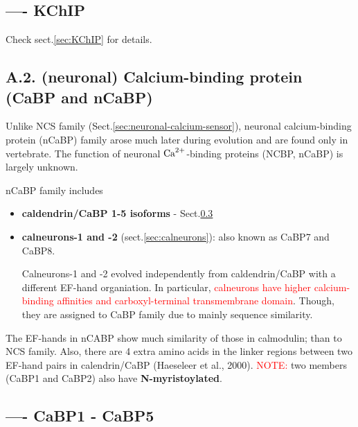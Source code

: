 \subsection{---- KChIP}

Check sect.\ref{sec:KChIP} for details.



\subsection{A.2. (neuronal) Calcium-binding protein (CaBP and nCaBP)}

Unlike NCS family (Sect.\ref{sec:neuronal-calcium-sensor}), neuronal
calcium-binding protein (nCaBP) family arose much later during evolution and are
found only in vertebrate.   The function of neuronal ${\text{Ca}^{2+}}$-binding proteins
(NCBP, nCaBP) is largely unknown.

nCaBP family includes

\begin{itemize}

  \item {\bf caldendrin/CaBP 1-5 isoforms} - Sect.\ref{sec:CaBP1-CaBP5}
  
  \item {\bf calneurons-1 and -2} (sect.\ref{sec:calneurons}): also known as
  CaBP7 and CaBP8.
  
  Calneurons-1 and -2 evolved independently from caldendrin/CaBP with a
  different EF-hand organiation. In particular, \textcolor{red}{calneurons have
  higher calcium-binding affinities and carboxyl-terminal transmembrane domain}.
  Though, they are assigned to CaBP family due to mainly sequence similarity.
\end{itemize} 

The EF-hands in nCABP show much similarity of those in calmodulin; than to NCS
family. Also, there are 4 extra amino acids in the linker regions between two
EF-hand pairs in calendrin/CaBP (Haeseleer et al., 2000). \textcolor{red}{NOTE:}
two members (CaBP1 and CaBP2) also have {\bf N-myristoylated}.

\subsection{---- CaBP1 - CaBP5}
\label{sec:CaBP1-CaBP5}

